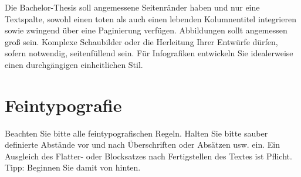 Die Bachelor-Thesis soll angemessene Seitenränder haben und nur eine Textspalte, sowohl einen toten als auch einen lebenden Kolumnentitel integrieren sowie zwingend über eine Paginierung verfügen. Abbildungen sollt angemessen groß sein. Komplexe Schaubilder oder die Herleitung Ihrer Entwürfe dürfen, sofern notwendig, seitenfüllend sein. Für Infografiken entwickeln Sie idealerweise einen durchgängigen einheitlichen Stil.

\section*{Feintypografie}

Beachten Sie bitte alle feintypografischen Regeln. Halten Sie bitte sauber definierte Abstände vor und nach Überschriften oder Absätzen usw. ein. Ein Ausgleich des Flatter- oder Blocksatzes nach Fertigstellen des Textes ist Pflicht. Tipp: Beginnen Sie damit von hinten.